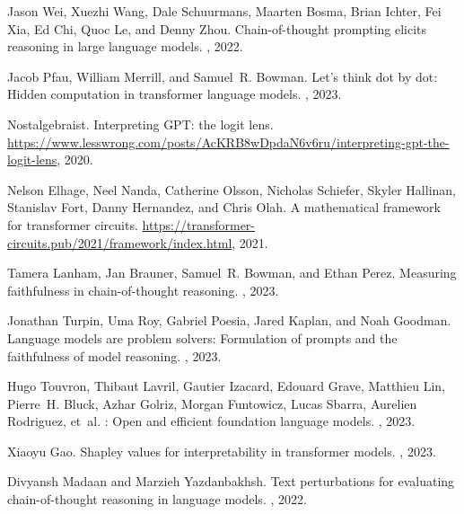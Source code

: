 \documentclass{article}
\begin{document}

\begin{thebibliography}{10}

Jason Wei, Xuezhi Wang, Dale Schuurmans, Maarten Bosma, Brian Ichter, Fei Xia,
  Ed Chi, Quoc Le, and Denny Zhou.
\newblock Chain-of-thought prompting elicits reasoning in large language
  models.
, 2022.

Jacob Pfau, William Merrill, and Samuel~R. Bowman.
\newblock Let's think dot by dot: Hidden computation in transformer language
  models.
, 2023.

Nostalgebraist.
\newblock Interpreting {GPT}: the logit lens.
\newblock
  \url{https://www.lesswrong.com/posts/AcKRB8wDpdaN6v6ru/interpreting-gpt-the-logit-lens},
  2020.

Nelson Elhage, Neel Nanda, Catherine Olsson, Nicholas Schiefer, Skyler Hallinan,
  Stanislav Fort, Danny Hernandez, and Chris Olah.
\newblock A mathematical framework for transformer circuits.
\newblock
  \url{https://transformer-circuits.pub/2021/framework/index.html}, 2021.

Tamera Lanham, Jan Brauner, Samuel~R. Bowman, and Ethan Perez.
\newblock Measuring faithfulness in chain-of-thought reasoning.
, 2023.

Jonathan Turpin, Uma Roy, Gabriel Poesia, Jared Kaplan, and Noah Goodman.
\newblock Language models are problem solvers: Formulation of prompts and the
  faithfulness of model reasoning.
, 2023.

Hugo Touvron, Thibaut Lavril, Gautier Izacard, Edouard Grave, Matthieu
  Lin, Pierre~H. Bluck, Azhar Golriz, Morgan Funtowicz, Lucas
  Sbarra, Aurelien Rodriguez, et~al.
: Open and efficient foundation language models.
, 2023.

Xiaoyu Gao.
\newblock Shapley values for interpretability in transformer models.
, 2023.

Divyansh Madaan and Marzieh Yazdanbakhsh.
\newblock Text perturbations for evaluating chain-of-thought reasoning in
  language models.
, 2022.

\end{thebibliography}
\end{document}
